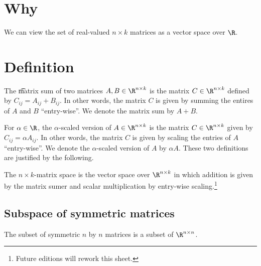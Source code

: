 

\section*{Why}

We can view the set of real-valued $n \times k$ matrices as a vector space over $\R $.

\section*{Definition}

The \t{matrix sum} of two matrices $A, B \in \R ^{n \times k}$ is the matrix $C \in \R ^{n \times k}$ defined by $C_{ij} = A_{ij} + B_{ij}$.
In other words, the matrix $C$ is given by summing the entires of $A$ and $B$ ``entry-wise''.
We denote the matrix sum by $A + B$.

For $\alpha  \in \R $, the \t{$\alpha $-scaled version} of $A \in \R ^{n \times k}$ is the matrix $C \in \R ^{n \times k}$ given by $C_{ij} = \alpha  A_{ij}$.
In other words, the matrix $C$ is given by scaling the entries of $A$ ``entry-wise''.
We denote the $\alpha $-scaled version of $A$ by $\alpha  A$.
These two definitions are justified by the following.

The \t{$n \times k$-matrix space} is the vector space over $\R ^{n \times  k}$ in which addition is given by the matrix sumer and scalar multiplication by entry-wise scaling.\footnote{Future editions will rework this sheet.}

\subsection*{Subspace of symmetric matrices}

The subset of symmetric $n$ by $n$ matrices is a subset of $\R ^{n \times  n}$.

\blankpage